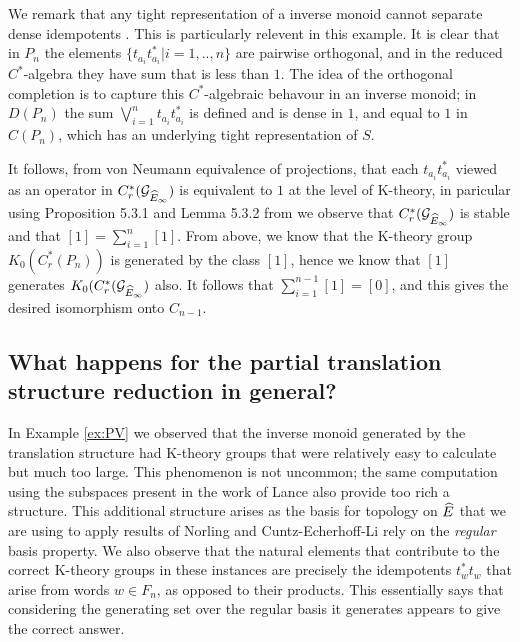 \begin{example}
\begin{example}
We remark that any tight representation of a inverse monoid cannot separate dense idempotents \cite{MR2419901}. This is particularly relevent in this example. It is clear that in $P_{n}$ the elements $\lbrace t_{a_{i}}t_{a_{i}}^{*} | i = 1,..,n \rbrace$ are pairwise orthogonal, and in the reduced $C^{*}$-algebra they have sum that is less than $1$. The idea of the orthogonal completion is to capture this $C^{*}$-algebraic behavour in an inverse monoid; in $D(P_{n})$ the sum $\bigvee_{i=1}^{n} t_{a_{i}}t_{a_{i}}^{*}$ is defined and is dense in $1$, and equal to $1$ in $C(P_{n})$, which has an underlying tight representation of $S$. 

It follows, from von Neumann equivalence of projections, that each $t_{a_{i}}t_{a_{i}}^{*}$ viewed as an operator in $C^{*}_{r}(\mathcal{G}_{\widehat{E}_{\infty}})$ is equivalent to $1$ at the level of K-theory, in paricular using Proposition 5.3.1 and Lemma 5.3.2 from \cite{MR1222415} we observe that $C^{*}_{r}(\mathcal{G}_{\widehat{E}_{\infty}})$ is stable and that $[1]=\sum_{i=1}^{n}[1]$. From above, we know that the K-theory group $K_{0}(C^{*}_{r}(P_{n}))$ is generated by the class $[1]$, hence we know that $[1]$ generates $K_{0}(C^{*}_{r}(\mathcal{G}_{\widehat{E}_{\infty}})$ also. It follows that $\sum_{i=1}^{n-1}[1]=[0]$, and this gives the desired isomorphism onto $C_{n-1}$.

\end{example}

\subsection{What happens for the partial translation structure reduction in general?}

In Example \ref{ex:PV} we observed that the inverse monoid generated by the translation structure had K-theory groups that were relatively easy to calculate but much too large. This phenomenon is not uncommon; the same computation using the subspaces present in the work of Lance \cite{MR723010} also provide too rich a structure. This additional structure arises as the basis for topology on $\widehat{E}$ that we are using to apply results of Norling and Cuntz-Echerhoff-Li rely on the \textit{regular} basis property. We also observe that the natural elements that contribute to the correct K-theory groups in these instances are precisely the idempotents $t_{w}^{*}t_{w}$ that arise from words $w \in F_{n}$, as opposed to their products. This essentially says that considering the generating set over the regular basis it generates appears to give the correct answer.


\end{example}
